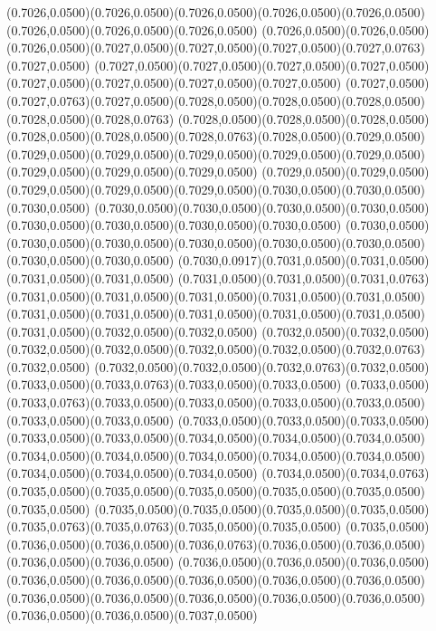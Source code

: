 (0.7026,0.0500)(0.7026,0.0500)(0.7026,0.0500)(0.7026,0.0500)(0.7026,0.0500)(0.7026,0.0500)(0.7026,0.0500)(0.7026,0.0500)
(0.7026,0.0500)(0.7026,0.0500)(0.7026,0.0500)(0.7027,0.0500)(0.7027,0.0500)(0.7027,0.0500)(0.7027,0.0763)(0.7027,0.0500)
(0.7027,0.0500)(0.7027,0.0500)(0.7027,0.0500)(0.7027,0.0500)(0.7027,0.0500)(0.7027,0.0500)(0.7027,0.0500)(0.7027,0.0500)
(0.7027,0.0500)(0.7027,0.0763)(0.7027,0.0500)(0.7028,0.0500)(0.7028,0.0500)(0.7028,0.0500)(0.7028,0.0500)(0.7028,0.0763)
(0.7028,0.0500)(0.7028,0.0500)(0.7028,0.0500)(0.7028,0.0500)(0.7028,0.0500)(0.7028,0.0763)(0.7028,0.0500)(0.7029,0.0500)
(0.7029,0.0500)(0.7029,0.0500)(0.7029,0.0500)(0.7029,0.0500)(0.7029,0.0500)(0.7029,0.0500)(0.7029,0.0500)(0.7029,0.0500)
(0.7029,0.0500)(0.7029,0.0500)(0.7029,0.0500)(0.7029,0.0500)(0.7029,0.0500)(0.7030,0.0500)(0.7030,0.0500)(0.7030,0.0500)
(0.7030,0.0500)(0.7030,0.0500)(0.7030,0.0500)(0.7030,0.0500)(0.7030,0.0500)(0.7030,0.0500)(0.7030,0.0500)(0.7030,0.0500)
(0.7030,0.0500)(0.7030,0.0500)(0.7030,0.0500)(0.7030,0.0500)(0.7030,0.0500)(0.7030,0.0500)(0.7030,0.0500)(0.7030,0.0500)
(0.7030,0.0917)(0.7031,0.0500)(0.7031,0.0500)(0.7031,0.0500)(0.7031,0.0500)
\PST@Solid(0.7031,0.0500)(0.7031,0.0500)(0.7031,0.0763)(0.7031,0.0500)(0.7031,0.0500)(0.7031,0.0500)(0.7031,0.0500)(0.7031,0.0500)
(0.7031,0.0500)(0.7031,0.0500)(0.7031,0.0500)(0.7031,0.0500)(0.7031,0.0500)(0.7031,0.0500)(0.7032,0.0500)(0.7032,0.0500)
(0.7032,0.0500)(0.7032,0.0500)(0.7032,0.0500)(0.7032,0.0500)(0.7032,0.0500)(0.7032,0.0500)(0.7032,0.0763)(0.7032,0.0500)
(0.7032,0.0500)(0.7032,0.0500)(0.7032,0.0763)(0.7032,0.0500)(0.7033,0.0500)(0.7033,0.0763)(0.7033,0.0500)(0.7033,0.0500)
(0.7033,0.0500)(0.7033,0.0763)(0.7033,0.0500)(0.7033,0.0500)(0.7033,0.0500)(0.7033,0.0500)(0.7033,0.0500)(0.7033,0.0500)
(0.7033,0.0500)(0.7033,0.0500)(0.7033,0.0500)(0.7033,0.0500)(0.7033,0.0500)(0.7034,0.0500)(0.7034,0.0500)(0.7034,0.0500)
(0.7034,0.0500)(0.7034,0.0500)(0.7034,0.0500)(0.7034,0.0500)(0.7034,0.0500)(0.7034,0.0500)(0.7034,0.0500)(0.7034,0.0500)
(0.7034,0.0500)(0.7034,0.0763)(0.7035,0.0500)(0.7035,0.0500)(0.7035,0.0500)(0.7035,0.0500)(0.7035,0.0500)(0.7035,0.0500)
(0.7035,0.0500)(0.7035,0.0500)(0.7035,0.0500)(0.7035,0.0500)(0.7035,0.0763)(0.7035,0.0763)(0.7035,0.0500)(0.7035,0.0500)
(0.7035,0.0500)(0.7036,0.0500)(0.7036,0.0500)(0.7036,0.0763)(0.7036,0.0500)(0.7036,0.0500)(0.7036,0.0500)(0.7036,0.0500)
(0.7036,0.0500)(0.7036,0.0500)(0.7036,0.0500)(0.7036,0.0500)(0.7036,0.0500)(0.7036,0.0500)(0.7036,0.0500)(0.7036,0.0500)
(0.7036,0.0500)(0.7036,0.0500)(0.7036,0.0500)(0.7036,0.0500)(0.7036,0.0500)(0.7036,0.0500)(0.7036,0.0500)(0.7037,0.0500)

